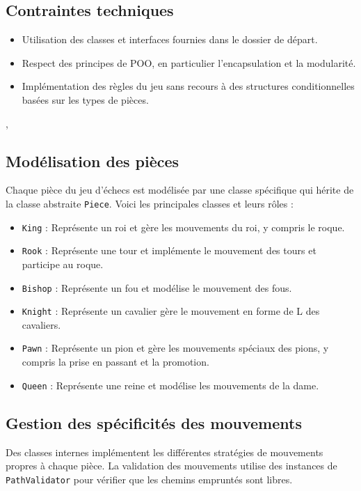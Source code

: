 \documentclass[12pt]{report}
\begin{document}
    \subsection*{Contraintes techniques}
    \begin{itemize}
        \item Utilisation des classes et interfaces fournies dans le dossier de départ.
        \item Respect des principes de POO, en particulier l'encapsulation et la modularité.
        \item Implémentation des règles du jeu sans recours à des structures conditionnelles basées sur les types de pièces.
    \end{itemize}

    ,
    \subsection*{Modélisation des pièces}
    Chaque pièce du jeu d'échecs est modélisée par une classe spécifique qui hérite de la classe abstraite \texttt{Piece}. Voici les principales classes et leurs rôles :
    \begin{itemize}
        \item \texttt{King} : Représente un roi et gère les mouvements du roi, y compris le roque.
        \item \texttt{Rook} : Représente une tour et implémente le mouvement des tours et participe au roque.
        \item \texttt{Bishop} : Représente un fou et modélise le mouvement des fous.
        \item \texttt{Knight} : Représente un cavalier gère le mouvement en forme de L des cavaliers.
        \item \texttt{Pawn} : Représente un pion et gère les mouvements spéciaux des pions, y compris la prise en passant et la promotion.
        \item \texttt{Queen} : Représente une reine et modélise les mouvements de la dame.
    \end{itemize}

    \subsection*{Gestion des spécificités des mouvements}
    Des classes internes implémentent les différentes stratégies de mouvements propres à chaque pièce. La validation des mouvements utilise des instances de \texttt{PathValidator} pour vérifier que les chemins empruntés sont libres.
\end{document}
